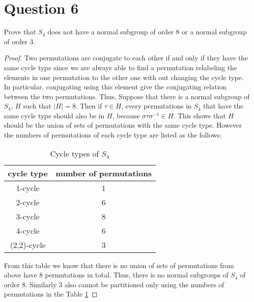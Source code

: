 \section{Question 6}

\begin{question}
    Prove that $S_4$ does not have a normal subgroup of order 8 or a normal subgroup of order $3$.
\end{question}

\begin{answer}
    \begin{proof}
        Two permutations are conjugate to each other if and only if they have the same cycle type since we are always able to find a permutation relabeling the elements in one permutation to the other one with out changing the cycle type. In particular, conjugating using this element give the conjugating relation between the two permutations. Thus, Suppose that there is a normal subgroup of $S_4$, $H$ such that $\lvert H \rvert = 8$. Then if $\tau \in H$, every permutations in $S_4$ that have the same cycle type should also be in $H$, because $\sigma \tau \sigma^{-1} \in H$. This shows that $H$ should be the union of sets of permutations with the same cycle type. However the numbers of permutations of each cycle type are listed as the follows:
        \begin{table}[H]
            \centering
            \begin{tabular}{|c|c|}
            \hline
            \textbf{cycle type} & \textbf{number of permutations} \\ \hline
            1-cycle             & 1                               \\ \hline
            2-cycle             & 6                               \\ \hline
            3-cycle             & 8                               \\ \hline
            4-cycle             & 6                               \\ \hline
            (2,2)-cycle         & 3                               \\ \hline
            \end{tabular}
            \caption{Cycle types of $S_4$}
            \label{tab:tab1}
        \end{table}
        From this table we know that there is no union of sets of permutations from above have $8$ permutations in total. Thus, there is no normal subgroups of $S_4$ of order $8$. Similarly $3$ also cannot be partitioned only using the numbers of permutations in the Table \ref{tab:tab1}
    \end{proof}
\end{answer}